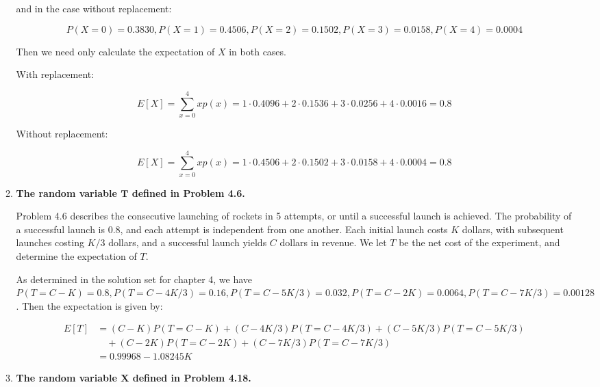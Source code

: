 \documentclass[10pt, oneside]{article}   	%
\theoremstyle{definition}
\begin{document}
\begin{enumerate}[label=7.\arabic*]
\begin{enumerate}
	 and in the case without replacement:
	 
	  \[ P(X=0) = 0.3830, P(X = 1) = 0.4506, P(X = 2) = 0.1502, P(X = 3) = 0.0158, P(X = 4) = 0.0004 \]

	Then we need only calculate the expectation of $X$ in both cases.
	
	With replacement:
	
	\[ E[X] = \sum^4_{x=0} x p(x) = 1 \cdot 0.4096 + 2 \cdot 0.1536 + 3 \cdot 0.0256 + 4 \cdot 0.0016 = \boxed{0.8} \]
	
	Without replacement:
	
	\[ E[X] = \sum^4_{x=0} x p(x) = 1 \cdot 0.4506 + 2 \cdot 0.1502 + 3 \cdot 0.0158 + 4 \cdot 0.0004 = \boxed{0.8} \]
	
	\item  \begin{tcolorbox}[
	  colback=Cerulean!5!white,
	  colframe=Cerulean!75!black]
	\textbf{The random variable $\bm{T}$ defined in Problem 4.6.}
	\end{tcolorbox}
	
	Problem 4.6 describes the consecutive launching of rockets in 5 attempts, or until a successful launch is achieved. The probability of a successful launch is 0.8, and each attempt is independent from one another. Each initial launch costs $K$ dollars, with subsequent launches costing $K/3$ dollars, and a successful launch yields $C$ dollars in revenue. We let $T$ be the net cost of the experiment, and determine the expectation of $T$.
	
	As determined in the solution set for chapter 4, we have $P(T = C-K) = 0.8, P(T = C - 4K/3) = 0.16, P(T = C - 5K/3) = 0.032, P(T = C - 2K) = 0.0064, P(T = C - 7K/3) = 0.00128$. Then the expectation is given by:
	
	\begin{align*}
	E[T] &= (C-K) P(T = C-K) + (C - 4K/3) P(T = C - 4K/3) + (C - 5K/3) P(T = C - 5K/3) \\ 
	&\quad + (C - 2K) P(T = C - 2K) + (C - 7K/3) P(T = C - 7K/3) \\
	&= \boxed{0.99968 - 1.08245 K}
	\end{align*}
	
	\item  \begin{tcolorbox}[
	  colback=Cerulean!5!white,
	  colframe=Cerulean!75!black]
	\textbf{The random variable $\bm{X}$ defined in Problem 4.18.}
	\end{tcolorbox}
	

\end{enumerate}
\end{enumerate}
\end{document}
